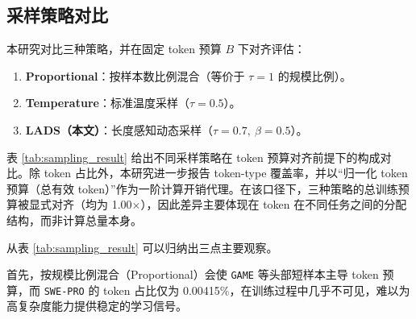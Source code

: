 \documentclass[UTF8]{article}
\begin{document}
\subsection{采样策略对比}\label{sec:sampling_eval}

本研究对比三种策略，并在固定 token 预算 $B$ 下对齐评估：
\begin{enumerate}
    \item \textbf{Proportional}：按样本数比例混合（等价于 $\tau=1$ 的规模比例）。
    \item \textbf{Temperature}：标准温度采样（$\tau=0.5$）。
    \item \textbf{LADS（本文）}：长度感知动态采样（$\tau=0.7,\ \beta=0.5$）。
\end{enumerate}

表 \ref{tab:sampling_result} 给出不同采样策略在 token 预算对齐前提下的构成对比。除 token 占比外，本研究进一步报告 token-type 覆盖率，并以“归一化 token 预算（总有效 token）”作为一阶计算开销代理。在该口径下，三种策略的总训练预算被显式对齐（均为 1.00$\times$），因此差异主要体现在 token 在不同任务之间的分配结构，而非计算总量本身。

\begin{table}[H]
\centering
\small
\setlength{\tabcolsep}{4pt}
\renewcommand{\arraystretch}{1.15}
\caption{不同采样策略下的数据构成与覆盖率对比（按 token 口径，token 预算对齐）}
\label{tab:sampling_result}

\end{table}



从表 \ref{tab:sampling_result} 可以归纳出三点主要观察。

首先，按规模比例混合（Proportional）会使 \texttt{GAME} 等头部短样本主导 token 预算，而 \texttt{SWE-PRO} 的 token 占比仅为 0.00415\%，在训练过程中几乎不可见，难以为高复杂度能力提供稳定的学习信号。
\end{document}
